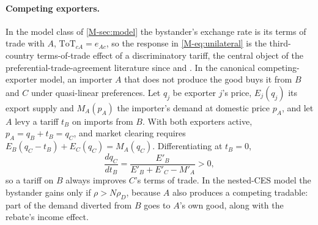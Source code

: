 \documentclass[11pt]{article}
\numberwithin{equation}{section}
\theoremstyle{plain}
\newcommand{\ToT}{\mathrm{ToT}}
\begin{document}
\paragraph{Competing exporters.} In the model class of \cref{M-sec:model} the bystander's exchange rate is its terms of trade with $A$, $\ToT_{cA}=e_{Ac}$, so the response in \cref{M-eq:unilateral} is the third-country terms-of-trade effect of a discriminatory tariff, the central object of the preferential-trade-agreement literature since \citet{viner1950} and \citet{mundell1964}. In the canonical competing-exporter model, an importer $A$ that does not produce the good buys it from $B$ and $C$ under quasi-linear preferences. Let $q_j$ be exporter $j$'s price, $E_j(q_j)$ its export supply and $M_A(p_A)$ the importer's demand at domestic price $p_A$, and let $A$ levy a tariff $t_B$ on imports from $B$. With both exporters active, $p_A=q_B+t_B=q_C$, and market clearing requires $E_B(q_C-t_B)+E_C(q_C)=M_A(q_C)$. Differentiating at $t_B=0$,
\begin{equation}
\frac{dq_C}{dt_B}=\frac{E'_B}{E'_B+E'_C-M'_A}>0,
\end{equation}
so a tariff on $B$ always improves $C$'s terms of trade. In the nested-CES model the bystander gains only if $\rho>N\rho_D$, because $A$ also produces a competing tradable: part of the demand diverted from $B$ goes to $A$'s own good, along with the rebate's income effect.
\end{document}
